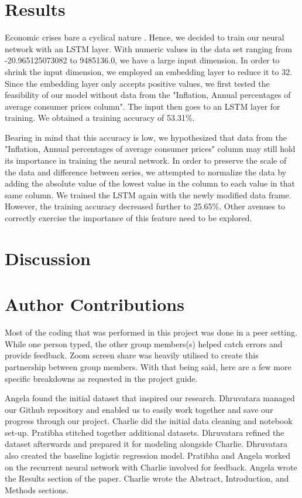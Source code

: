\documentclass[12pt]{article}
\begin{document}
\section{Results}
Economic crises bare a cyclical nature \cite{10.1007/978-3-030-15577-3_11}. Hence, we decided to train our neural network with an LSTM layer. With numeric values in the data set ranging from -20.965125073082 to 9485136.0, we have a large input dimension. In order to shrink the input dimension, we employed an embedding layer to reduce it to 32. Since the embedding layer only accepts positive values, we first tested the feasibility of our model without data from the "Inflation, Annual percentages of average consumer prices column". The input then goes to an LSTM layer for training. We obtained a training accuracy of 53.31\%.

Bearing in mind that this accuracy is low, we hypothesized that data from the "Inflation, Annual percentages of average consumer prices" column may still hold its importance in training the neural network. In order to preserve the scale of the data and difference between series, we attempted to normalize the data by adding the absolute value of the lowest value in the column to each value in that same column. We trained the LSTM again with the newly modified data frame. However, the training accuracy decreased further to 25.65\%. Other avenues to correctly exercise the importance of this feature need to be explored. 

\section{Discussion}

\section{Author Contributions}
Most of the coding that was performed in this project was done in a peer setting. While one person typed, the other group members(s) helped catch errors and provide feedback. Zoom screen share was heavily utilised to create this partnership between group members. With that being said, here are a few more specific breakdowns as requested in the project guide. 

Angela found the initial dataset that inspired our research. Dhruvatara managed our Github repository and enabled us to easily work together and save our progress through our project. Charlie did the initial data cleaning and notebook set-up. Pratibha stitched together additional datasets. Dhruvatara refined the dataset afterwards and prepared it for modeling alongside Charlie. Dhruvatara also created the baseline logistic regression model. Pratibha and Angela worked on the recurrent neural network with Charlie involved for feedback. Angela wrote the Results section of the paper. Charlie wrote the Abstract, Introduction, and Methods sections.



\printbibliography
\end{document}
